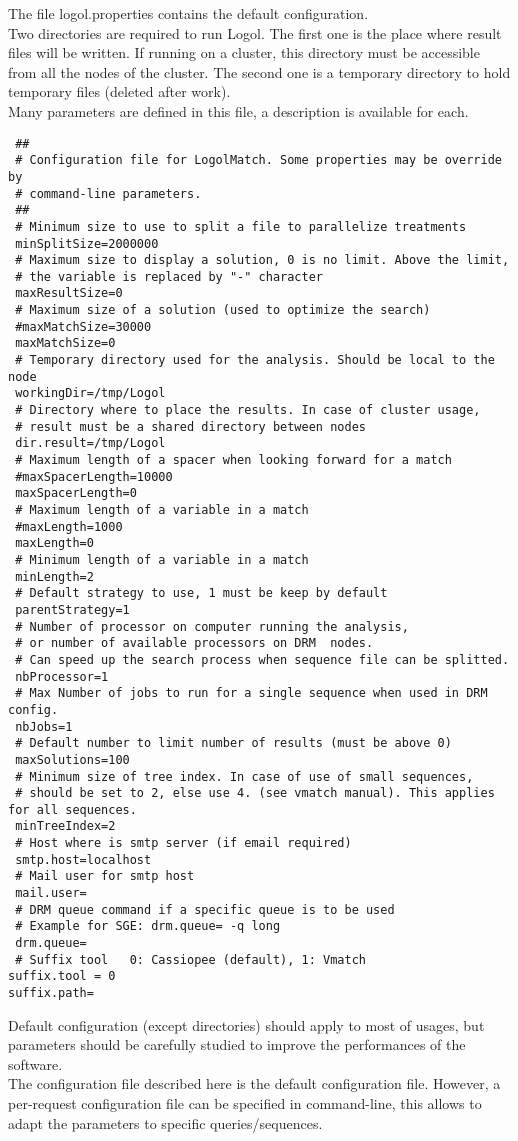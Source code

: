 \documentclass[11pt]{article}
\begin{document}
 The file logol.properties contains the default configuration.\\
 Two directories are required to run Logol. The first one is the place where result files will be written. If running on a cluster, this directory must be accessible from all the nodes of the cluster. The second one is a temporary directory to hold temporary files (deleted after work).\\
 Many parameters are defined in this file, a description is available for each.\\
{\small
\begin{verbatim}
 ##
 # Configuration file for LogolMatch. Some properties may be override by
 # command-line parameters.
 ##
 # Minimum size to use to split a file to parallelize treatments
 minSplitSize=2000000
 # Maximum size to display a solution, 0 is no limit. Above the limit,
 # the variable is replaced by "-" character
 maxResultSize=0
 # Maximum size of a solution (used to optimize the search)
 #maxMatchSize=30000
 maxMatchSize=0
 # Temporary directory used for the analysis. Should be local to the node
 workingDir=/tmp/Logol
 # Directory where to place the results. In case of cluster usage,
 # result must be a shared directory between nodes
 dir.result=/tmp/Logol
 # Maximum length of a spacer when looking forward for a match
 #maxSpacerLength=10000
 maxSpacerLength=0
 # Maximum length of a variable in a match
 #maxLength=1000
 maxLength=0
 # Minimum length of a variable in a match
 minLength=2
 # Default strategy to use, 1 must be keep by default
 parentStrategy=1
 # Number of processor on computer running the analysis, 
 # or number of available processors on DRM  nodes. 
 # Can speed up the search process when sequence file can be splitted.
 nbProcessor=1
 # Max Number of jobs to run for a single sequence when used in DRM config.
 nbJobs=1
 # Default number to limit number of results (must be above 0)
 maxSolutions=100
 # Minimum size of tree index. In case of use of small sequences, 
 # should be set to 2, else use 4. (see vmatch manual). This applies for all sequences.
 minTreeIndex=2
 # Host where is smtp server (if email required)
 smtp.host=localhost
 # Mail user for smtp host
 mail.user=
 # DRM queue command if a specific queue is to be used
 # Example for SGE: drm.queue= -q long
 drm.queue=
 # Suffix tool   0: Cassiopee (default), 1: Vmatch
suffix.tool = 0
suffix.path=
\end{verbatim}
}
Default configuration (except directories) should apply to most of usages, but parameters should be carefully studied to improve the performances of the software.\\
The configuration file described here is the default configuration file. However, a per-request configuration file can be specified in command-line, this allows to adapt the parameters to specific queries/sequences.
\end{document}
